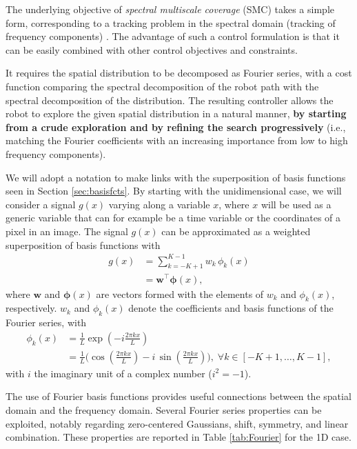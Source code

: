\documentclass[10pt,a4paper]{article} %
\newcommand{\trsp}{{\scriptscriptstyle\top}}
\begin{document}
The underlying objective of \emph{spectral multiscale coverage} (SMC) takes a simple form, corresponding to a tracking problem in the spectral domain (tracking of frequency components) \cite{Mathew09}. The advantage of such a control formulation is that it can be easily combined with other control objectives and constraints.

It requires the spatial distribution to be decomposed as Fourier series, with a cost function comparing the spectral decomposition of the robot path with the spectral decomposition of the distribution. The resulting controller allows the robot to explore the given spatial distribution in a natural manner, \textbf{by starting from a crude exploration and by refining the search progressively} (i.e., matching the Fourier coefficients with an increasing importance from low to high frequency components). 

We will adopt a notation to make links with the superposition of basis functions seen in Section \ref{sec:basisfcts}. By starting with the unidimensional case, we will consider a signal $g(x)$ varying along a variable $x$, where $x$ will be used as a generic variable that can for example be a time variable or the coordinates of a pixel in an image. The signal $g(x)$ can be approximated as a weighted superposition of basis functions with 
\begin{align*}
	g(x) &= \sum_{k=-K\!+\!1}^{K\!-\!1} w_k \, \phi_k(x)\\
	&= \bm{w}^\trsp \bm{\phi}(x), 
\end{align*}
where $\bm{w}$ and $\bm{\phi}(x)$ are vectors formed with the elements of $w_k$ and $\phi_k(x)$, respectively.
$w_k$ and $\phi_k(x)$ denote the coefficients and basis functions of the Fourier series, with
\begin{align}
	\phi_k(x) &= \frac{1}{L} \exp\!\left(-i\frac{2\pi k x}{L}\right)\nonumber\\
	&= \frac{1}{L} \Bigg(\!\cos\!\left(\frac{2\pi k x}{L}\right) - i \, \sin\!\left(\frac{2\pi k x}{L}\right) \!\Bigg)
	, \;\forall k\!\in\![-K\!+\!1,\ldots,K\!-\!1],
	\label{eq:complExp1D}
\end{align}
with $i$ the imaginary unit of a complex number ($i^2=-1$).

The use of Fourier basis functions provides useful connections between the spatial domain and the frequency domain. Several Fourier series properties can be exploited, notably regarding zero-centered Gaussians, shift, symmetry, and linear combination. 
These properties are reported in Table \ref{tab:Fourier} for the 1D case.
\end{document}
